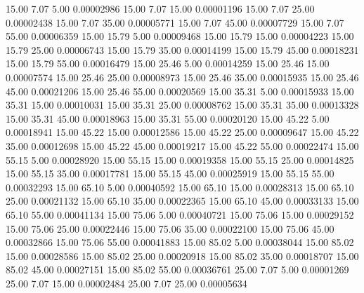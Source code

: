      15.00      7.07      5.00     0.00002986
     15.00      7.07     15.00     0.00001196
     15.00      7.07     25.00     0.00002438
     15.00      7.07     35.00     0.00005771
     15.00      7.07     45.00     0.00007729
     15.00      7.07     55.00     0.00006359
     15.00     15.79      5.00     0.00009468
     15.00     15.79     15.00     0.00004223
     15.00     15.79     25.00     0.00006743
     15.00     15.79     35.00     0.00014199
     15.00     15.79     45.00     0.00018231
     15.00     15.79     55.00     0.00016479
     15.00     25.46      5.00     0.00014259
     15.00     25.46     15.00     0.00007574
     15.00     25.46     25.00     0.00008973
     15.00     25.46     35.00     0.00015935
     15.00     25.46     45.00     0.00021206
     15.00     25.46     55.00     0.00020569
     15.00     35.31      5.00     0.00015933
     15.00     35.31     15.00     0.00010031
     15.00     35.31     25.00     0.00008762
     15.00     35.31     35.00     0.00013328
     15.00     35.31     45.00     0.00018963
     15.00     35.31     55.00     0.00020120
     15.00     45.22      5.00     0.00018941
     15.00     45.22     15.00     0.00012586
     15.00     45.22     25.00     0.00009647
     15.00     45.22     35.00     0.00012698
     15.00     45.22     45.00     0.00019217
     15.00     45.22     55.00     0.00022474
     15.00     55.15      5.00     0.00028920
     15.00     55.15     15.00     0.00019358
     15.00     55.15     25.00     0.00014825
     15.00     55.15     35.00     0.00017781
     15.00     55.15     45.00     0.00025919
     15.00     55.15     55.00     0.00032293
     15.00     65.10      5.00     0.00040592
     15.00     65.10     15.00     0.00028313
     15.00     65.10     25.00     0.00021132
     15.00     65.10     35.00     0.00022365
     15.00     65.10     45.00     0.00033133
     15.00     65.10     55.00     0.00041134
     15.00     75.06      5.00     0.00040721
     15.00     75.06     15.00     0.00029152
     15.00     75.06     25.00     0.00022446
     15.00     75.06     35.00     0.00022100
     15.00     75.06     45.00     0.00032866
     15.00     75.06     55.00     0.00041883
     15.00     85.02      5.00     0.00038044
     15.00     85.02     15.00     0.00028586
     15.00     85.02     25.00     0.00020918
     15.00     85.02     35.00     0.00018707
     15.00     85.02     45.00     0.00027151
     15.00     85.02     55.00     0.00036761
     25.00      7.07      5.00     0.00001269
     25.00      7.07     15.00     0.00002484
     25.00      7.07     25.00     0.00005634
